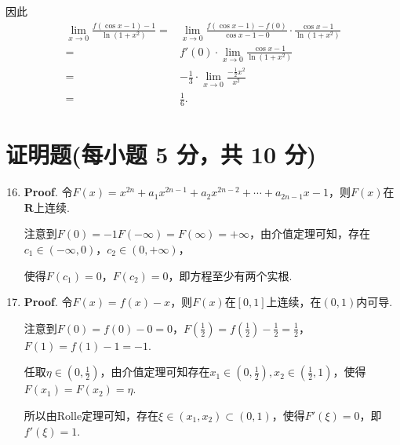 \documentclass[../Main.tex]{subfiles}
\begin{document}
\begin{enumerate}
          因此
          \[
              \begin{aligned}
                  \lim_{x\to 0}\frac{f(\cos x-1)-1}{\ln(1+x^2)}= & \lim_{x\to0}\frac{f(\cos x-1)-f(0)}{\cos x -1 -0}\cdot\frac{\cos x -1}{\ln(1+x^2)} \\
                  =                                              & f'(0)\cdot\lim_{x\to0}\frac{\cos x -1}{\ln(1+x^2)}                                 \\
                  =                                              & -\frac{1}{3}\cdot\lim_{x\to0}\frac{-\frac{1}{2}x^2}{x^2}                           \\
                  =                                              & \frac{1}{6}.
              \end{aligned}
          \]
\end{enumerate}

\section{证明题(每小题 5 分，共 10 分)}
\begin{enumerate}
    \setcounter{enumi}{15}
    \item \textbf{Proof}. 令$F(x)=x^{2n}+a_{1}x^{2n-1}+a_{2}x^{2n-2}+\cdots+
              a_{2n-1}x-1$，则$F(x)$在$\mathbf{R}$上连续.

          注意到$F(0)=-1F(-\infty)=F(\infty)=+\infty$，由介值定理可知，存在$c_{1}\in
              (-\infty,0)$，$c_{2}\in(0,+\infty)$，

          使得$F(c_{1})=0$，$F(c_{2})=0$，即方程至少有两个实根.

    \item \textbf{Proof}. 令$F(x)=f(x)-x$，则$F(x)$在$[0,1]$上连续，在$(0,1)$内可导.

          注意到$F(0)=f(0)-0=0$，$F\left(\frac{1}{2}\right)=f\left(\frac{1}{2}\right)
              -\frac{1}{2}=\frac{1}{2}$，$F(1)=f(1)-1=-1$.

          任取$\eta\in\left(0,\frac{1}{2}\right)$，由介值定理可知存在$x_{1}\in\left(0
              ,\frac{1}{2}\right),x_{2}\in\left(\frac{1}{2},1\right)$，使得$F(x_{1})=F(x_{2}
              )=\eta$.

          所以由Rolle定理可知，存在$\xi\in(x_{1},x_{2})\subset(0,1)$，使得$F'(\xi)=0$，即$f
              '(\xi)=1$.
\end{enumerate}
\end{document}
